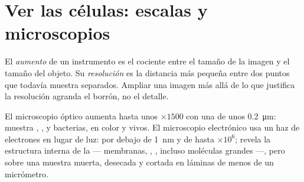 \section{Ver las células: escalas y microscopios}

\begin{definition}\label{def:g10:cells-common-unit:magnification}
El \emph{aumento} de un instrumento es el cociente entre
el tamaño de la imagen y el tamaño del objeto. Su
\emph{resolución} es la distancia más pequeña entre
dos puntos que todavía muestra separados. Ampliar una imagen más allá
de lo que justifica la resolución agranda el borrón, no el detalle.
\end{definition}

\begin{proposition}\label{prop:g10:cells-common-unit:microscopes}
El microscopio óptico aumenta hasta unos $\times 1500$ con una
 de unos \qty{0.2}{\micro m}: muestra , ,
 y bacterias, en color y vivos. El microscopio electrónico
usa un haz de electrones en lugar de luz:  por debajo de
\qty{1}{nm} y  de hasta $\times 10^6$; revela la estructura
interna de la  --- membranas, , , incluso
moléculas grandes ---, pero sobre una muestra muerta, desecada y cortada
en láminas de menos de un micrómetro.
\end{proposition}
\admitted

